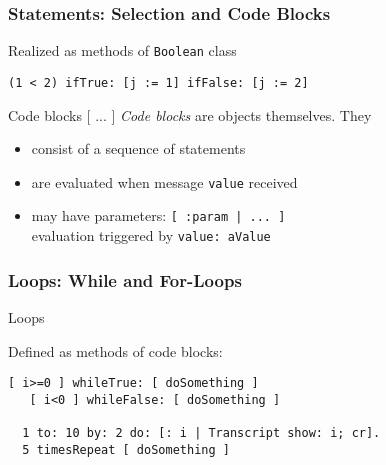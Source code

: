 \documentclass[handout]{beamer}
\newcommand{\Blue}[1]{\color{blue}#1\color{black}}
\begin{document}

\begin{frame}[fragile]
\frametitle{Statements: Selection and Code Blocks}

Realized as methods of \texttt{Boolean} class

\begin{lstlisting}[language=Smalltalk]
  (1 < 2) ifTrue: [j := 1] ifFalse: [j := 2]
\end{lstlisting} 

\pause\medskip

\begin{block}{Code blocks [ ... ]}
\emph{Code blocks} are objects themselves. They
\begin{itemize}
  \item consist of a sequence of statements
  \item are evaluated when message \texttt{value} received
  \item may have parameters: 
    \lstinline[language=Smalltalk]{[ :param | ... ]} \\
    evaluation triggered by \texttt{value: aValue}
\end{itemize}

\end{block}


\end{frame}


\begin{frame}[fragile]
\frametitle{Loops: While and For-Loops}

\Blue{Loops}\medskip

Defined as methods of code blocks:

\begin{lstlisting}[language=Smalltalk]
   [ i>=0 ] whileTrue: [ doSomething ]
   [ i<0 ] whileFalse: [ doSomething ]

  1 to: 10 by: 2 do: [: i | Transcript show: i; cr].
  5 timesRepeat [ doSomething ]   
\end{lstlisting} 

\end{frame}

\end{document}
